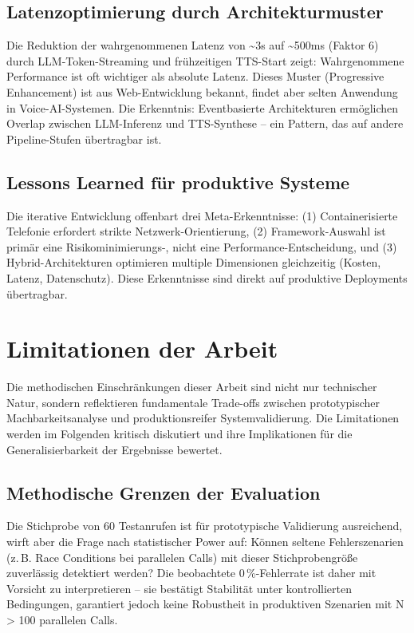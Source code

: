 \subsection{Latenzoptimierung durch Architekturmuster}

Die Reduktion der wahrgenommenen Latenz von \textasciitilde 3s auf \textasciitilde 500ms (Faktor 6) durch \acrshort{LLM}-Token-Streaming und frühzeitigen \acrshort{TTS}-Start zeigt: Wahrgenommene Performance ist oft wichtiger als absolute Latenz. Dieses Muster (Progressive Enhancement) ist aus Web-Entwicklung bekannt, findet aber selten Anwendung in Voice-\acrshort{AI}-Systemen. Die Erkenntnis: Eventbasierte Architekturen ermöglichen Overlap zwischen \acrshort{LLM}-Inferenz und \acrshort{TTS}-Synthese -- ein Pattern, das auf andere Pipeline-Stufen übertragbar ist.

\subsection{Lessons Learned für produktive Systeme}

Die iterative Entwicklung offenbart drei Meta-Erkenntnisse: (1) Containerisierte Telefonie erfordert strikte Netzwerk-Orientierung, (2) Framework-Auswahl ist primär eine Risikominimierungs-, nicht eine Performance-Entscheidung, und (3) Hybrid-Architekturen optimieren multiple Dimensionen gleichzeitig (Kosten, Latenz, Datenschutz). Diese Erkenntnisse sind direkt auf produktive Deployments übertragbar.

\section{Limitationen der Arbeit}

Die methodischen Einschränkungen dieser Arbeit sind nicht nur technischer Natur, sondern reflektieren fundamentale Trade-offs zwischen prototypischer Machbarkeitsanalyse und produktionsreifer Systemvalidierung. Die Limitationen werden im Folgenden kritisch diskutiert und ihre Implikationen für die Generalisierbarkeit der Ergebnisse bewertet.

\subsection{Methodische Grenzen der Evaluation}

Die Stichprobe von 60 Testanrufen ist für prototypische Validierung ausreichend, wirft aber die Frage nach statistischer Power auf: Können seltene Fehlerszenarien (z.\,B. Race Conditions bei parallelen Calls) mit dieser Stichprobengröße zuverlässig detektiert werden? Die beobachtete 0\,\%-Fehlerrate ist daher mit Vorsicht zu interpretieren -- sie bestätigt Stabilität unter kontrollierten Bedingungen, garantiert jedoch keine Robustheit in produktiven Szenarien mit N > 100 parallelen Calls.

